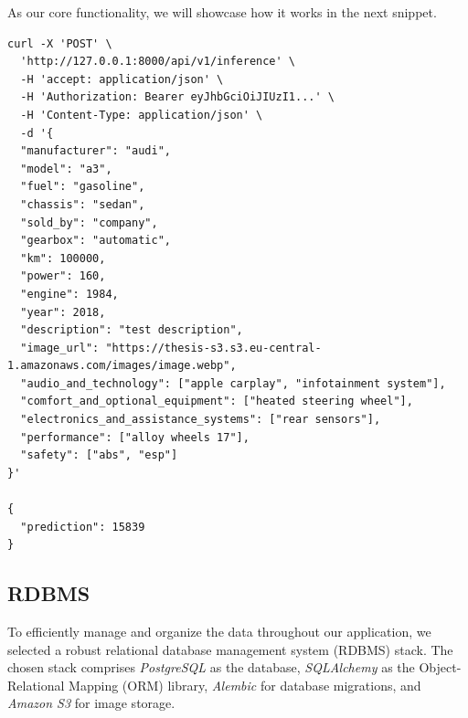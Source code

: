 As our core functionality, we will showcase how it works in the next snippet.
\begin{lstlisting}
curl -X 'POST' \
  'http://127.0.0.1:8000/api/v1/inference' \
  -H 'accept: application/json' \
  -H 'Authorization: Bearer eyJhbGciOiJIUzI1...' \
  -H 'Content-Type: application/json' \
  -d '{
  "manufacturer": "audi",
  "model": "a3",
  "fuel": "gasoline",
  "chassis": "sedan",
  "sold_by": "company",
  "gearbox": "automatic",
  "km": 100000,
  "power": 160,
  "engine": 1984,
  "year": 2018,
  "description": "test description",
  "image_url": "https://thesis-s3.s3.eu-central-1.amazonaws.com/images/image.webp",
  "audio_and_technology": ["apple carplay", "infotainment system"],
  "comfort_and_optional_equipment": ["heated steering wheel"],
  "electronics_and_assistance_systems": ["rear sensors"],
  "performance": ["alloy wheels 17"],
  "safety": ["abs", "esp"]
}'

{
  "prediction": 15839
}
\end{lstlisting}

\subsection{RDBMS}
To efficiently manage and organize the data throughout our application, we selected a robust relational database management system (RDBMS) stack. The chosen stack comprises \textit{PostgreSQL} \cite{postgresql} as the database, \textit{SQLAlchemy} \cite{sqlalchemy} as the Object-Relational Mapping (ORM) library, \textit{Alembic} \cite{alembic} for database migrations, and \textit{Amazon S3} \cite{amazon_s3} for image storage.

